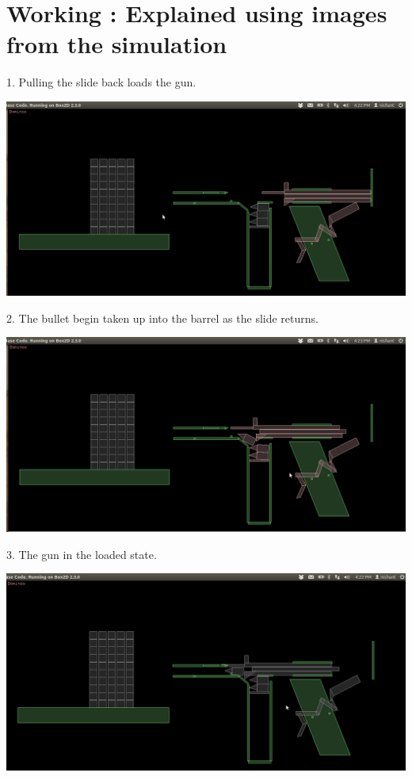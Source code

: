 \documentclass [11pt]{report}
\begin{document}
\section{Working : Explained using images from the simulation}
1. Pulling the slide back loads the gun.\newline
\begin{center}

\includegraphics[scale=0.3]{./images/loading.png}\\
\end{center}
2. The bullet begin taken up into the barrel as the slide returns.\newline
\begin{center}
\includegraphics[scale=0.3]{./images/bulletup.png}\\

\end{center}
3. The gun in the loaded state.\newline
\begin{center}
\includegraphics[scale=0.3]{./images/loaded.png}\\
\end{center}
\end{document}
